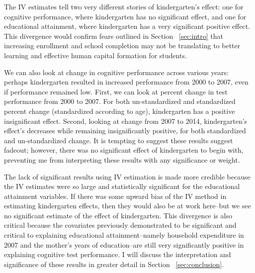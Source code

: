 The IV estimates tell two very different stories of kindergarten’s effect: one for cognitive performance, where kindergarten has no significant effect, and one for educational attainment, where kindergarten has a very significant positive effect. This divergence would confirm fears outlined in Section ~\ref{sec:intro} that increasing enrollment and school completion may not be translating to better learning and effective human capital formation for students. 

We can also look at change in cognitive performance across various years: perhaps kindergarten resulted in increased performance from 2000 to 2007, even if performance remained low. First, we can look at percent change in test performance from 2000 to 2007. For both un-standardized and standardized percent change (standardized according to age), kindergarten has a positive insignificant effect. Second, looking at change from 2007 to 2014, kindergarten’s effect’s decreases while remaining insignificantly positive, for both standardized and un-standardized change. It is tempting to suggest these results suggest fadeout; however, there was no significant effect of kindergarten to begin with, preventing me from interpreting these results with any significance or weight. 

The lack of significant results using IV estimation is made more credible because the IV estimates were so large and statistically significant for the educational attainment variables. If there was some upward bias of the IV method in estimating kindergarten effects, then they would also be at work here--but we see no significant estimate of the effect of kindergarten. This divergence is also critical because the covariates previously demonstrated to be significant and critical to explaining educational attainment--namely household expenditure in 2007 and the mother's years of education--are still very significantly positive in explaining cognitive test performance. I will discuss the interpretation and significance of these results in greater detail in Section ~\ref{sec:conclusion}. 


 